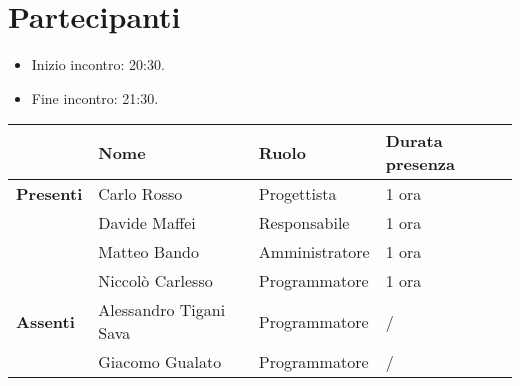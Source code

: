 \section*{Partecipanti}

\begin{itemize}
	\item Inizio incontro: 20:30.
	\item Fine incontro: 21:30.
\end{itemize}


\begin{center}
	\begin{tabular}{llll}
		                  & \textbf{Nome}          & \textbf{Ruolo} & \textbf{Durata presenza} \\
		\hline
		\textbf{Presenti} & Carlo Rosso            & Progettista    & 1 ora                    \\
		                  & Davide Maffei          & Responsabile   & 1 ora                    \\
		                  & Matteo Bando           & Amministratore & 1 ora                    \\
		                  & Niccolò Carlesso       & Programmatore  & 1 ora                    \\
		\hline
		\textbf{Assenti}  & Alessandro Tigani Sava & Programmatore  & /                        \\
		                  & Giacomo Gualato        & Programmatore  & /                        \\
	\end{tabular}
\end{center}
